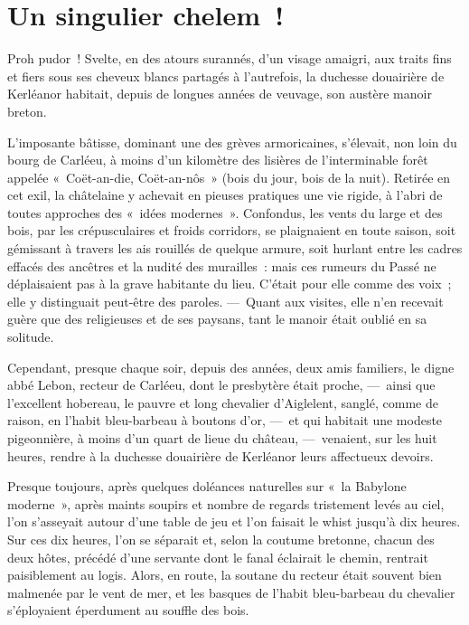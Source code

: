 \documentclass[french,twoside]{book} %
\newcommand{\salute}[1]{\bigbreak{#1}\par\medbreak}
\begin{document}
 \section[{Un singulier chelem !}]{Un singulier chelem !}\renewcommand{\leftmark}{Un singulier chelem !}


\salute{À Monsieur Henri Lavedan.}
\noindent Proh pudor !
\noindent Svelte, en des atours surannés, d’un visage amaigri, aux traits fins et fiers sous ses cheveux blancs partagés à l’autrefois, la duchesse douairière de Kerléanor habitait, depuis de longues années de veuvage, son austère manoir breton.\par
L’imposante bâtisse, dominant une des grèves armoricaines, s’élevait, non loin du bourg de Carléeu, à moins d’un kilomètre des lisières de l’interminable forêt appelée « Coët-an-die, Coët-an-nôs » (bois du jour, bois de la nuit). Retirée en cet exil, la châtelaine y achevait en pieuses pratiques une vie rigide, à l’abri de toutes approches des « idées modernes ». Confondus, les   vents du large et des bois, par les crépusculaires et froids corridors, se plaignaient en toute saison, soit gémissant à travers les ais rouillés de quelque armure, soit hurlant entre les cadres effacés des ancêtres et la nudité des murailles : mais ces rumeurs du Passé ne déplaisaient pas à la grave habitante du lieu. C’était pour elle comme des voix ; elle y distinguait peut-être des paroles. — Quant aux visites, elle n’en recevait guère que des religieuses et de ses paysans, tant le manoir était oublié en sa solitude.\par
Cependant, presque chaque soir, depuis des années, deux amis familiers, le digne abbé Lebon, recteur de Carléeu, dont le presbytère était proche, — ainsi que l’excellent hobereau, le pauvre et long chevalier d’Aiglelent, sanglé, comme de raison, en l’habit bleu-barbeau à boutons d’or, — et qui habitait une modeste pigeonnière, à moins d’un quart de lieue du château, — venaient, sur les huit heures, rendre à la duchesse douairière de Kerléanor leurs affectueux devoirs.\par
Presque toujours, après quelques doléances naturelles sur « la Babylone moderne », après   maints soupirs et nombre de regards tristement levés au ciel, l’on s’asseyait autour d’une table de jeu et l’on faisait le whist jusqu’à dix heures. Sur ces dix heures, l’on se séparait et, selon la coutume bretonne, chacun des deux hôtes, précédé d’une servante dont le fanal éclairait le chemin, rentrait paisiblement au logis. Alors, en route, la soutane du recteur était souvent bien malmenée par le vent de mer, et les basques de l’habit bleu-barbeau du chevalier s’éployaient éperdument au souffle des bois.\par
\end{document}
